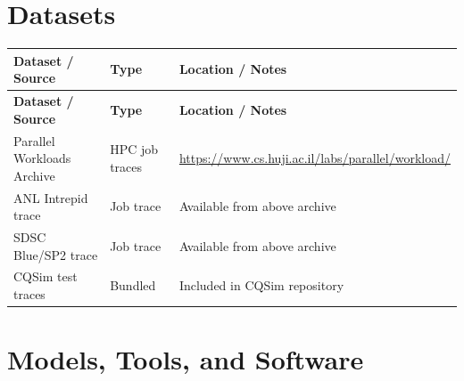 \documentclass[11pt,a4paper]{article}
\begin{document}
\section{Datasets}

\begin{longtable}{p{4.5cm} p{3.5cm} p{6cm}}
\toprule
\textbf{Dataset / Source} & \textbf{Type} & \textbf{Location / Notes} \\
\midrule
\endfirsthead
\toprule
\textbf{Dataset / Source} & \textbf{Type} & \textbf{Location / Notes} \\
\midrule
\endhead
Parallel Workloads Archive & HPC job traces & \url{https://www.cs.huji.ac.il/labs/parallel/workload/} \\
\midrule
ANL Intrepid trace & Job trace & Available from above archive \\
\midrule
SDSC Blue/SP2 trace & Job trace & Available from above archive \\
\midrule
CQSim test traces & Bundled & Included in CQSim repository \\
\bottomrule
\end{longtable}

\section{Models, Tools, and Software}
\end{document}
